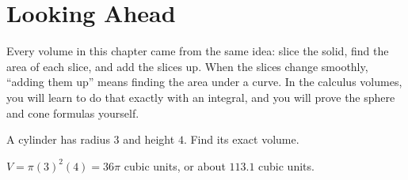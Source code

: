 \section{Looking Ahead}

Every volume in this chapter came from the same idea: slice the solid,
find the area of each slice, and add the slices up. When the slices change
smoothly, ``adding them up'' means finding the area under a curve. In the
calculus volumes, you will learn to do that exactly with an integral, and
you will prove the sphere and cone formulas yourself.

\begin{Exercise}[title={Another Cylinder}, label=vol_cyl]
A cylinder has radius $3$ and height $4$. Find its exact volume.
\end{Exercise}
\begin{Answer}[ref=vol_cyl]
$V = \pi(3)^2(4) = 36\pi$ cubic units, or about $113.1$ cubic units.
\end{Answer}
